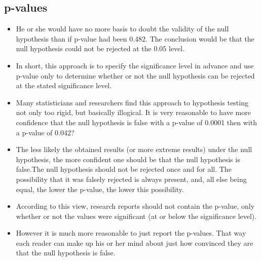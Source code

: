 \documentclass[]{report}
\begin{document}
	\subsection{p-values}
	\begin{itemize}
		\item He or she would have no more basis to doubt the validity of the null hypothesis than if p-value had been 0.482. The conclusion would be that the null hypothesis could not be rejected at the 0.05 level. \item In short, this approach is to specify the significance level in advance and use p-value only to determine whether or not the null hypothesis can be rejected at the stated significance level.
		\item 
		Many statisticians and researchers find this approach to hypothesis testing not only too rigid, but basically illogical. It is very reasonable to  have more confidence that the null hypothesis is false with a p-value of 0.0001 then with a p-value of 0.042? 
	\end{itemize}
	
	
	\begin{itemize}
		\item The less likely the obtained results (or more extreme results) under the null hypothesis, the more confident one should be that the null hypothesis is false.The null hypothesis should not be rejected once and for all. The possibility that it was falsely rejected is always present, and, all else being equal, the lower the p-value, the lower this possibility.
		\item According to this view, research reports should not contain the p-value, only whether or not the values were significant (at or below the significance level). 
		\item 
		However it is much more reasonable to just report the p-values. That way each reader can make up his or her mind about just how convinced they are that the null hypothesis is false.
	\end{itemize}
	
\end{document}
